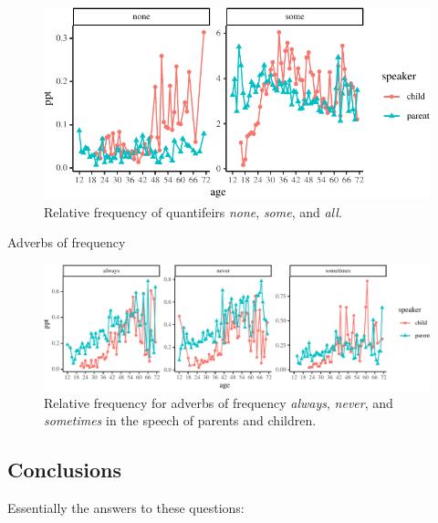 \documentclass[man,floatsintext,draftall]{apa6}
\begin{document}
\begin{figure}
\centering
\includegraphics{negation_production_files/figure-latex/quantifiers-1.pdf}
\caption{\label{fig:quantifiers}Relative frequency of quantifeirs \emph{none}, \emph{some}, and \emph{all}.}
\end{figure}

Adverbs of frequency

\begin{figure}
\centering
\includegraphics{negation_production_files/figure-latex/adverbs-1.pdf}
\caption{\label{fig:adverbs}Relative frequency for adverbs of frequency \emph{always}, \emph{never}, and \emph{sometimes} in the speech of parents and children.}
\end{figure}

\hypertarget{conclusions}{%
\subsection{Conclusions}\label{conclusions}}

Essentially the answers to these questions:
\end{document}
